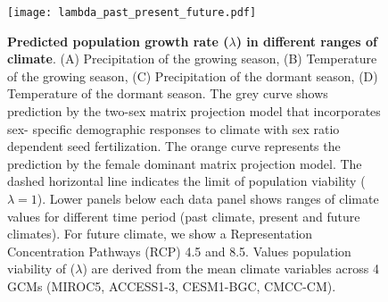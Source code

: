 \documentclass[9pt,twoside,lineno]{pnas-new}
\begin{document}
\begin{figure}
\centering
\texttt{[image: lambda\_past\_present\_future.pdf]}
\caption{\textbf{Predicted population growth rate ($\lambda$) in different ranges of climate}.
			(A) Precipitation of the growing season, (B) Temperature of the growing season, (C) Precipitation of the dormant season, (D) Temperature of the dormant season.
			The grey curve shows prediction by the two-sex matrix projection model that incorporates sex- specific demographic responses to climate with sex ratio dependent seed fertilization.
			The orange curve represents the prediction by the female dominant matrix projection model.
			The dashed horizontal line indicates the limit of population viability ($\lambda = 1$).
			Lower panels below each data panel shows  ranges of climate values for different time period (past climate, present and future climates).
			For future climate, we show a Representation Concentration Pathways (RCP) 4.5 and 8.5. Values population viability of ($\lambda$) are derived from the mean climate variables across 4 GCMs (MIROC5, ACCESS1-3, CESM1-BGC, CMCC-CM).
		}
\label{fig:lambda_LTRE}
\end{figure}
\clearpage
\end{document}
